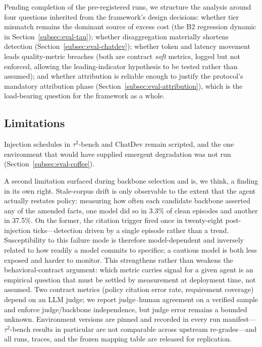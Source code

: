 \documentclass[conference]{IEEEtran}
\begin{document}
Pending completion of the pre-registered runs, we structure the analysis
around four questions inherited from the framework's design decisions:
whether tier mismatch remains the dominant source of excess cost (the B2
regression dynamic in Section~\ref{subsec:eval-tau}); whether disaggregation
materially shortens detection (Section~\ref{subsec:eval-chatdev}); whether
token and latency movement leads quality-metric breaches (both are contract
\emph{soft} metrics, logged but not enforced, allowing the leading-indicator
hypothesis to be tested rather than assumed); and whether attribution is
reliable enough to justify the protocol's mandatory attribution phase
(Section~\ref{subsec:eval-attribution}), which is the load-bearing question
for the framework as a whole.

\subsection{Limitations}
\label{subsec:eval-limitations}

Injection schedules in $\tau^2$-bench and ChatDev remain scripted, and the
one environment that would have supplied emergent degradation was not run
(Section~\ref{subsec:eval-coffee}).

A second limitation surfaced during backbone selection and is, we think,
a finding in its own right. Stale-corpus drift is only observable to the extent
that the agent actually restates policy: measuring how often each candidate
backbone asserted any of the amended facts, one model did so in 3.3\% of clean
episodes and another in 37.5\%. On the former, the citation trigger fired once
in twenty-eight post-injection ticks---detection driven by a single episode
rather than a trend. Susceptibility to this failure mode is therefore
model-dependent and inversely related to how readily a model commits to
specifics; a cautious model is both less exposed and harder to monitor. This
strengthens rather than weakens the behavioral-contract argument: which metric
carries signal for a given agent is an empirical question that must be settled
by measurement at deployment time, not assumed. Two contract metrics (policy citation error rate,
requirement coverage) depend on an LLM judge; we report judge--human agreement
on a verified sample and enforce judge/backbone independence, but judge error
remains a bounded unknown. Environment versions are pinned and recorded in
every run manifest---$\tau^2$-bench results in particular are not comparable
across upstream re-grades---and all runs, traces, and the frozen mapping table
are released for replication.
\end{document}

